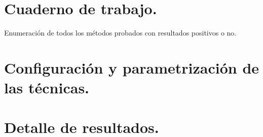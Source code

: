 


\section{Cuaderno de trabajo.}

Enumeración de todos los métodos probados con resultados positivos o no.
\section{Configuración y parametrización de las técnicas.}

\section{Detalle de resultados.}
